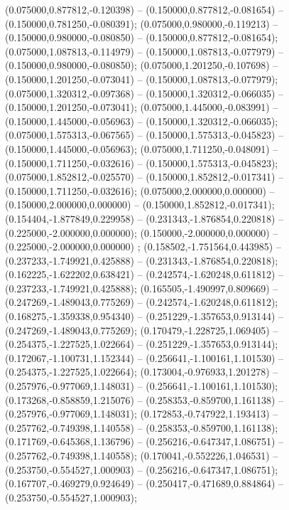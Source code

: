  (0.075000,0.877812,-0.120398) -- (0.150000,0.877812,-0.081654) -- (0.150000,0.781250,-0.080391);
 (0.075000,0.980000,-0.119213) -- (0.150000,0.980000,-0.080850) -- (0.150000,0.877812,-0.081654);
 (0.075000,1.087813,-0.114979) -- (0.150000,1.087813,-0.077979) -- (0.150000,0.980000,-0.080850);
 (0.075000,1.201250,-0.107698) -- (0.150000,1.201250,-0.073041) -- (0.150000,1.087813,-0.077979);
 (0.075000,1.320312,-0.097368) -- (0.150000,1.320312,-0.066035) -- (0.150000,1.201250,-0.073041);
 (0.075000,1.445000,-0.083991) -- (0.150000,1.445000,-0.056963) -- (0.150000,1.320312,-0.066035);
 (0.075000,1.575313,-0.067565) -- (0.150000,1.575313,-0.045823) -- (0.150000,1.445000,-0.056963);
 (0.075000,1.711250,-0.048091) -- (0.150000,1.711250,-0.032616) -- (0.150000,1.575313,-0.045823);
 (0.075000,1.852812,-0.025570) -- (0.150000,1.852812,-0.017341) -- (0.150000,1.711250,-0.032616);
 (0.075000,2.000000,0.000000) -- (0.150000,2.000000,0.000000) -- (0.150000,1.852812,-0.017341);
 (0.154404,-1.877849,0.229958) -- (0.231343,-1.876854,0.220818) -- (0.225000,-2.000000,0.000000);
 (0.150000,-2.000000,0.000000) -- (0.225000,-2.000000,0.000000) ;
 (0.158502,-1.751564,0.443985) -- (0.237233,-1.749921,0.425888) -- (0.231343,-1.876854,0.220818);
 (0.162225,-1.622202,0.638421) -- (0.242574,-1.620248,0.611812) -- (0.237233,-1.749921,0.425888);
 (0.165505,-1.490997,0.809669) -- (0.247269,-1.489043,0.775269) -- (0.242574,-1.620248,0.611812);
 (0.168275,-1.359338,0.954340) -- (0.251229,-1.357653,0.913144) -- (0.247269,-1.489043,0.775269);
 (0.170479,-1.228725,1.069405) -- (0.254375,-1.227525,1.022664) -- (0.251229,-1.357653,0.913144);
 (0.172067,-1.100731,1.152344) -- (0.256641,-1.100161,1.101530) -- (0.254375,-1.227525,1.022664);
 (0.173004,-0.976933,1.201278) -- (0.257976,-0.977069,1.148031) -- (0.256641,-1.100161,1.101530);
 (0.173268,-0.858859,1.215076) -- (0.258353,-0.859700,1.161138) -- (0.257976,-0.977069,1.148031);
 (0.172853,-0.747922,1.193413) -- (0.257762,-0.749398,1.140558) -- (0.258353,-0.859700,1.161138);
 (0.171769,-0.645368,1.136796) -- (0.256216,-0.647347,1.086751) -- (0.257762,-0.749398,1.140558);
 (0.170041,-0.552226,1.046531) -- (0.253750,-0.554527,1.000903) -- (0.256216,-0.647347,1.086751);
 (0.167707,-0.469279,0.924649) -- (0.250417,-0.471689,0.884864) -- (0.253750,-0.554527,1.000903);
